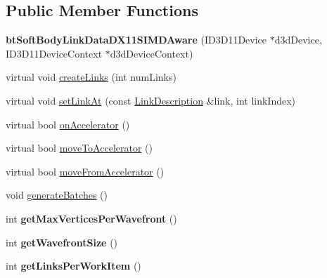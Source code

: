 \subsection*{Public Member Functions}
\begin{DoxyCompactItemize}
\item 
\hypertarget{classbt_soft_body_link_data_d_x11_s_i_m_d_aware_a267670e3a238d94e2b8bc99b5a780beb}{{\bfseries bt\+Soft\+Body\+Link\+Data\+D\+X11\+S\+I\+M\+D\+Aware} (I\+D3\+D11\+Device $\ast$d3d\+Device, I\+D3\+D11\+Device\+Context $\ast$d3d\+Device\+Context)}\label{classbt_soft_body_link_data_d_x11_s_i_m_d_aware_a267670e3a238d94e2b8bc99b5a780beb}

\item 
virtual void \hyperlink{classbt_soft_body_link_data_d_x11_s_i_m_d_aware_a8b3760b7e8393ad2ff03be02c8b91854}{create\+Links} (int num\+Links)
\item 
virtual void \hyperlink{classbt_soft_body_link_data_d_x11_s_i_m_d_aware_aa8139528d8d1c83643b46e2e3a8a6b35}{set\+Link\+At} (const \hyperlink{classbt_soft_body_link_data_1_1_link_description}{Link\+Description} \&link, int link\+Index)
\item 
virtual bool \hyperlink{classbt_soft_body_link_data_d_x11_s_i_m_d_aware_acc8a4475c093d0caf3da6e104ad33f5d}{on\+Accelerator} ()
\item 
virtual bool \hyperlink{classbt_soft_body_link_data_d_x11_s_i_m_d_aware_ab498ee8250262804abb96ee7f67cba29}{move\+To\+Accelerator} ()
\item 
virtual bool \hyperlink{classbt_soft_body_link_data_d_x11_s_i_m_d_aware_a86ffcd3e1eae29d3a9019790d4172990}{move\+From\+Accelerator} ()
\item 
void \hyperlink{classbt_soft_body_link_data_d_x11_s_i_m_d_aware_ac22f881862e6a2c2f7e57b8e50044827}{generate\+Batches} ()
\item 
\hypertarget{classbt_soft_body_link_data_d_x11_s_i_m_d_aware_a4bd59ce080fe45412bcba9e571ba7ec5}{int {\bfseries get\+Max\+Vertices\+Per\+Wavefront} ()}\label{classbt_soft_body_link_data_d_x11_s_i_m_d_aware_a4bd59ce080fe45412bcba9e571ba7ec5}

\item 
\hypertarget{classbt_soft_body_link_data_d_x11_s_i_m_d_aware_a65ef737048647732582654d261507431}{int {\bfseries get\+Wavefront\+Size} ()}\label{classbt_soft_body_link_data_d_x11_s_i_m_d_aware_a65ef737048647732582654d261507431}

\item 
\hypertarget{classbt_soft_body_link_data_d_x11_s_i_m_d_aware_ac47628aa9649a869e5083a1001ac1cd1}{int {\bfseries get\+Links\+Per\+Work\+Item} ()}\label{classbt_soft_body_link_data_d_x11_s_i_m_d_aware_ac47628aa9649a869e5083a1001ac1cd1}


\end{DoxyCompactItemize}
